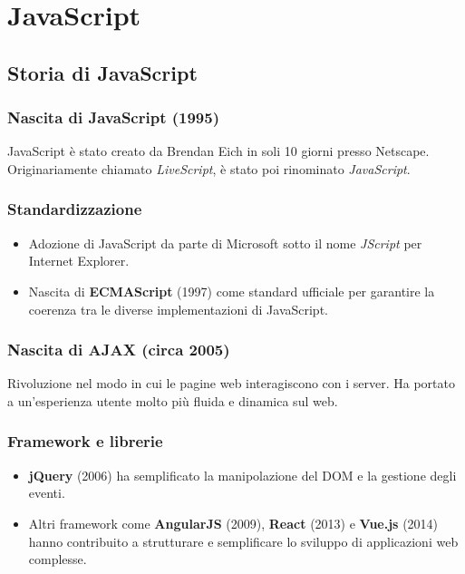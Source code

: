\chapter{JavaScript}

\section{Storia di JavaScript}

\subsection{Nascita di JavaScript (1995)}

JavaScript è stato creato da Brendan Eich in soli 10 giorni presso Netscape. Originariamente chiamato \textit{LiveScript}, è stato poi rinominato \textit{JavaScript}.

\subsection{Standardizzazione}

\begin{itemize}
    \item Adozione di JavaScript da parte di Microsoft sotto il nome \textit{JScript} per Internet Explorer.
    \item Nascita di \textbf{ECMAScript} (1997) come standard ufficiale per garantire la coerenza tra le diverse implementazioni di JavaScript.
\end{itemize}

\subsection{Nascita di AJAX (circa 2005)}

Rivoluzione nel modo in cui le pagine web interagiscono con i server. Ha portato a un'esperienza utente molto più fluida e dinamica sul web.

\subsection{Framework e librerie}

\begin{itemize}
    \item \textbf{jQuery} (2006) ha semplificato la manipolazione del DOM e la gestione degli eventi.
    \item Altri framework come \textbf{AngularJS} (2009), \textbf{React} (2013) e \textbf{Vue.js} (2014) hanno contribuito a strutturare e semplificare lo sviluppo di applicazioni web complesse.
\end{itemize}

